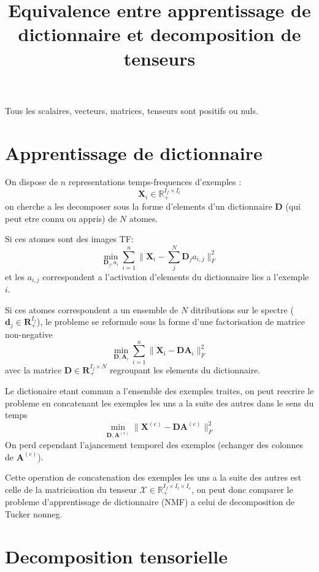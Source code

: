 \documentclass{article}
\begin{document}
\title{Equivalence entre apprentissage de dictionnaire et decomposition de tenseurs}

\maketitle




Tous les scalaires, vecteurs, matrices, tenseurs sont positifs ou nuls.\\


\section{Apprentissage de dictionnaire}

On dispose de $n$ representations temps-frequences d'exemples :
$$
\mathbf{X}_i \in \mathbb{R}_+^{I_f \times I_t} 
$$
on cherche a les decomposer sous la forme d'elements d'un dictionnaire $\mathbf{D}$
(qui peut etre connu ou appris) de $N$ atomes.


Si ces atomes sont des images TF: 
$$
\min_{\mathbf{D}_j,a_i}  \sum_{i=1}^n \|\mathbf{X}_i - \sum_j^{N} \mathbf{D}_j a_{i,j} \|_{F}^2
$$
et les $a_{i,j}$ correspondent a l'activation d'elements du dictionnaire lies a l'exemple $i$.

Si ces atomes correspondent a un ensemble de $N$ ditributions sur le spectre ($\mathbf{d}_j \in \mathbf{R}_+^{I_f}$), le probleme se reformule
sous la forme d'une factorisation de matrice non-negative
$$
\min_{\mathbf{D},\mathbf{A}_i} \sum_{i=1}^n \|\mathbf{X}_i -  \mathbf{D} \mathbf{A}_i \|_{F}^2
$$
avec la matrice $\mathbf{D} \in \mathbf{R}_+^{I_f \times N}$ regroupant les elements du dictionnaire.

Le dictionaire etant commun a l'ensemble des exemples traites, on peut reecrire le probleme en concatenant les exemples
les uns a la suite des autres dans le sens du temps
$$
\min_{\mathbf{D},\mathbf{A}^{(e)}}  \|\mathbf{X}^{(e)} -  \mathbf{D} \mathbf{A}^{(e)} \|_{F}^2
$$
On perd cependant l'ajancement temporel des exemples (echanger des colonnes de $\mathbf{A}^{(e)}$).


Cette operation de concatenation des exemples les uns a la suite des autres est celle de la matricisation du tenseur $\mathcal{X} \in \mathbb{R}_+^{I_f \times I_t \times I_e}$, on peut donc comparer
le probleme d'apprentissage de dictionnaire (NMF) a celui de decomposition de Tucker nonneg.


\section{Decomposition tensorielle}
\end{document}
